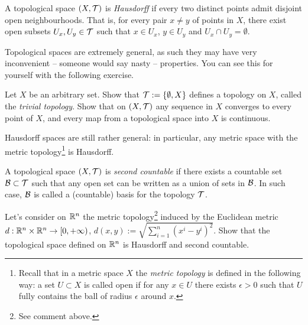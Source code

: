 \begin{definition}
  A topological space $(X, \mathcal{T})$ is \emph{Hausdorff} if every two distinct points admit disjoint open neighbourhoods. That is, for every pair $x\neq y$ of points in $X$, there exist open subsets $U_x, U_y\in\mathcal{T}$ such that $x\in U_x$, $y\in U_y$ and $U_x \cap U_y = \emptyset$.
\end{definition}

Topological spaces are extremely general, as such they may have very inconvenient -- someone would say nasty -- properties.
You can see this for yourself with the following exercise.

\begin{exercise}
Let $X$ be an arbitrary set. Show that $\mathcal{T}:=\{\emptyset, X\}$ defines a topology on $X$, called the \emph{trivial topology}. Show that on $(X, \mathcal{T})$ any sequence in $X$ converges to every point of $X$, and every map from a topological space into $X$ is continuous.
\end{exercise}

Hausdorff spaces are still rather general: in particular, any metric space with the metric topology\footnote{Recall that in a metric space $X$ the \emph{metric topology} is defined in the following way: a set $U\subset X$ is called open if for any $x\in U$ there exists $\epsilon>0$ such that $U$ fully contains the ball of radius $\epsilon$ around $x$.} is Hausdorff.

\begin{definition}
  A topological space $(X, \mathcal{T})$ is \emph{second countable} if there exists a countable set $\mathcal{B}\subset\mathcal{T}$ such that any open set can be written as a union of sets in $\mathcal{B}$.
  In such case, $\mathcal{B}$ is called a (countable) basis for the topology $\mathcal{T}$.
\end{definition}

\begin{exercise}\label{exe:rntopsp}
  Let's consider on $\mathbb{R}^n$ the metric topology\footnote{See comment above.} induced by the Euclidean metric $d: \mathbb{R}^n \times \mathbb{R}^n \to [0, +\infty)$, $d(x,y) := \sqrt{\sum_{i=1}^n (x^i-y^i)^2}$.
  Show that the topological space defined on $\mathbb{R}^n$ is Hausdorff and second countable.
\end{exercise}

